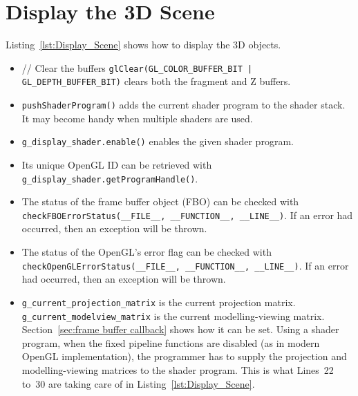 \documentclass[11pt,oneside,a4paper,final]{article}
\begin{document}
\begin{center}

\end{center}


\section{Display the 3D Scene}
\label{sec:Display Scene}

Listing~\ref{lst:Display_Scene} shows how to display the 3D objects. 
\begin{itemize}
 \item 
    // Clear the buffers
    \verb+glClear(GL_COLOR_BUFFER_BIT | GL_DEPTH_BUFFER_BIT)+ clears both the 
      fragment and Z buffers.

 \item \verb+pushShaderProgram()+ adds the current shader program to the shader 
    stack. It may become handy when multiple shaders are used.

 \item \verb+g_display_shader.enable()+ enables the given shader program.

 \item Its unique OpenGL ID can be retrieved with 
    \verb+g_display_shader.getProgramHandle()+.

 \item The status of the frame buffer object (FBO) can be checked with 
    \verb+checkFBOErrorStatus(__FILE__, __FUNCTION__, __LINE__)+. 
    If an error had occurred, then an exception will be thrown.

 \item The status of the OpenGL's error flag can be checked with 
    \verb+checkOpenGLErrorStatus(__FILE__, __FUNCTION__, __LINE__)+. 
    If an error had occurred, then an exception will be thrown.

 \item \verb+g_current_projection_matrix+ is the current projection matrix. 
 \verb+g_current_modelview_matrix+ is the current modelling-viewing matrix. 
  Section~\ref{sec:frame buffer callback} shows how it can be set. 
  Using a shader program, when the fixed pipeline functions are disabled (as in 
  modern OpenGL implementation), the programmer has to supply the projection 
  and modelling-viewing matrices to the shader program. This is what Lines~22 
to~30 are taking care of in Listing~\ref{lst:Display_Scene}.


\end{itemize}
\end{document}
